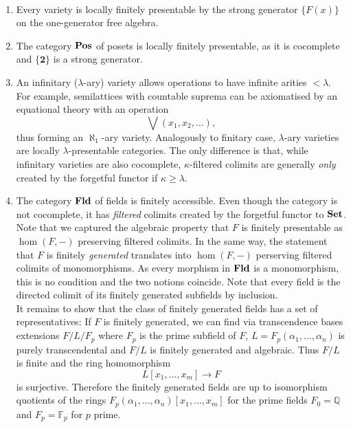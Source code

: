 \begin{Example}\
\begin{enumerate}
\item Every variety is locally finitely presentable by the strong generator $\{ F(x) \}$ on the one-generator free algebra.

\item The category $\mathbf{Pos}$ of posets is locally finitely presentable, as it is cocomplete and $\{\mathbf 2\}$ is a strong generator. 

\item An infinitary ($\lambda$-ary) variety allows operations to have infinite arities $< \lambda$. For example, semilattices with countable suprema can be axiomatised by an equational theory with an operation
\[ \bigvee(x_1, x_2, \ldots), \]
thus forming an $\aleph_1$-ary variety. Analogously to finitary case, $\lambda$-ary varieties are locally $\lambda$-presentable categories. The only difference is that, while infinitary varieties are also cocomplete, $\kappa$-filtered colimits are generally \emph{only} created by the forgetful functor if $\kappa \geq \lambda$.

\item The category $\mathbf{Fld}$ of fields is finitely accessible. Even though the category is not cocomplete, it has \emph{filtered} colimits created by the forgetful functor to $\mathbf{Set}$. \\

Note that we captured the algebraic property that $F$ is finitely presentable as $\hom(F,-)$ preserving filtered colimits. In the same way, the statement that $F$ is finitely \emph{generated} translates into $\hom(F,-)$ perserving filtered colimits of monomorphisms. As every morphism in $\mathbf{Fld}$ is a monomorphism, this is no condition and the two notions coincide. Note that every field is the directed colimit of its finitely generated subfields by inclusion. \\

It remains to show that the class of finitely generated fields has a set of representatives: If $F$ is finitely generated, we can find via transcendence bases extensions $F/L/F_p$ where $F_p$ is the prime subfield of $F$, $L=F_p(\alpha_1,\ldots,\alpha_n)$ is purely transcendental and $F/L$ is finitely generated and algebraic. Thus $F/L$ is finite and the ring homomorphism
\[ L[x_1,\ldots,x_m] \to F \]
is surjective. Therefore the finitely generated fields are up to isomorphism quotients of the rings $F_p(\alpha_1, \ldots,\alpha_n)[x_1,\ldots,x_m]$ for the prime fields $F_0 = \mathbb Q$ and $F_p = \mathbb F_p$ for $p$ prime.
\end{enumerate}
\end{Example}

